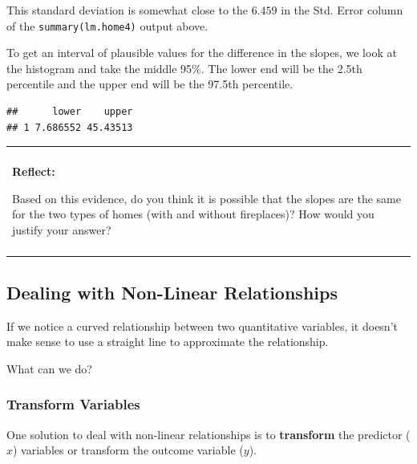 \documentclass[]{book}
\newenvironment{Shaded}{\begin{snugshade}}{\end{snugshade}}
\newcommand{\DataTypeTok}[1]{\textcolor[rgb]{0.13,0.29,0.53}{#1}}
\newcommand{\FloatTok}[1]{\textcolor[rgb]{0.00,0.00,0.81}{#1}}
\newcommand{\KeywordTok}[1]{\textcolor[rgb]{0.13,0.29,0.53}{\textbf{#1}}}
\newcommand{\NormalTok}[1]{#1}
\newcommand{\OperatorTok}[1]{\textcolor[rgb]{0.81,0.36,0.00}{\textbf{#1}}}
\newcommand{\StringTok}[1]{\textcolor[rgb]{0.31,0.60,0.02}{#1}}
\newenvironment{reflect}
{
    \begin{center}
    
    \begin{tabular}{|p{0.8\textwidth}|}
    \rowcolor{LightBlue}
    \hline\\
    \rowcolor{LightBlue}
    \textbf{Reflect:}
}
{
    \\\rowcolor{LightBlue}
    \\\hline
    \end{tabular} 
    \end{center}
}
\begin{document}
This standard deviation is somewhat close to the \(6.459\) in the Std. Error column of the \texttt{summary(lm.home4)} output above.

To get an interval of plausible values for the difference in the slopes, we look at the histogram and take the middle 95\%. The lower end will be the 2.5th percentile and the upper end will be the 97.5th percentile.

\begin{Shaded}
\end{Shaded}

\begin{verbatim}
##      lower    upper
## 1 7.686552 45.43513
\end{verbatim}

\begin{reflect}
Based on this evidence, do you think it is possible that the slopes are
the same for the two types of homes (with and without fireplaces)? How
would you justify your answer?
\end{reflect}

\hypertarget{dealing-with-non-linear-relationships}{%
\subsection{Dealing with Non-Linear Relationships}\label{dealing-with-non-linear-relationships}}

If we notice a curved relationship between two quantitative variables, it doesn't make sense to use a straight line to approximate the relationship.

What can we do?

\hypertarget{transform-variables}{%
\subsubsection{Transform Variables}\label{transform-variables}}

One solution to deal with non-linear relationships is to \textbf{transform} the predictor (\(x\)) variables or transform the outcome variable (\(y\)).
\end{document}
